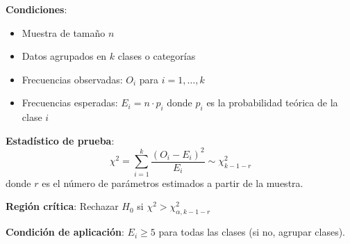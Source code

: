 \documentclass[10pt,a4paper]{article}
\begin{document}
\begin{tcolorbox}[title=Test $\chi^2$ de Bondad de Ajuste]
    \textbf{Condiciones}: 
    \begin{itemize}
        \item Muestra de tamaño $n$
        \item Datos agrupados en $k$ clases o categorías
        \item Frecuencias observadas: $O_i$ para $i = 1, \ldots, k$
        \item Frecuencias esperadas: $E_i = n \cdot p_i$ donde $p_i$ es la probabilidad teórica de la clase $i$
    \end{itemize}
    
    \textbf{Estadístico de prueba}:
    \[
        \chi^2 = \sum_{i=1}^k \frac{(O_i - E_i)^2}{E_i} \sim \chi^2_{k-1-r}
    \]
    donde $r$ es el número de parámetros estimados a partir de la muestra.
    
    \textbf{Región crítica}: Rechazar $H_0$ si $\chi^2 > \chi^2_{\alpha, k-1-r}$
    
    \textbf{Condición de aplicación}: $E_i \geq 5$ para todas las clases (si no, agrupar clases).
\end{tcolorbox}
\end{document}

